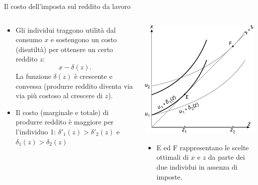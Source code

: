 \documentclass[aspectratio=64,12pt]{beamer}
\begin{document}
\begin{frame}{Il costo dell'imposta sul reddito da lavoro}
\begin{columns}
\begin{column}{.45\columnwidth}
\begin{itemize}
\item Gli individui traggono utilità dal consumo $x$ e sostengono un costo
(disutiltà) per ottenere un certo reddito $z$: $$x-\delta(z).$$ La funzione
$\delta(z)$ è crescente e convessa (produrre reddito diventa via via più costoso al
crescere di $z$).
\item Il costo (marginale e totale) di produrre reddito è maggiore per l'individuo
1: $\delta'_1(z)> \delta'_2(z)$ e $\delta_1(z)>\delta_2(z)$
\end{itemize}
\end{column}

\begin{column}{.45\columnwidth}
\begin{center}
\includegraphics[scale=.8]{./figure/effetto-distorsivo-imposte-ql-1.pdf}
\end{center}

\begin{itemize}\small
\item E ed F rappresentano le scelte ottimali di $x$ e $z$ da parte dei due
individui in assenza di imposte.
\end{itemize}
\end{column}
\end{columns}
\end{frame}
\end{document}

